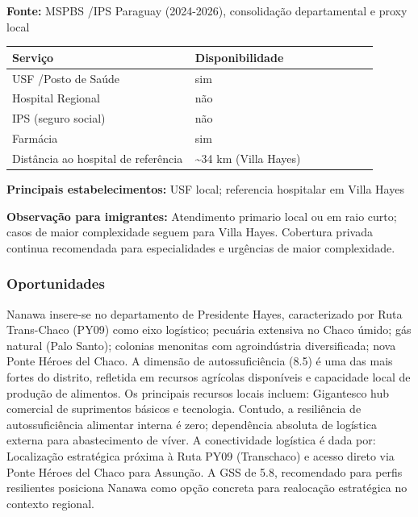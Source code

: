 \textbf{Fonte:} MSPBS /\allowbreak  IPS Paraguay (2024-2026), consolidação
departamental e proxy local

{\def\LTcaptype{none} %
\begin{longtable}{@{}>{\raggedright\arraybackslash}p{0.45\linewidth} >{\raggedright\arraybackslash}p{0.45\linewidth}@{}}
\toprule\noalign{}
Serviço & Disponibilidade \\
\midrule\noalign{}
\endhead
\bottomrule\noalign{}
\endlastfoot
USF /\allowbreak  Posto de Saúde & sim \\
Hospital Regional & não \\
IPS (seguro social) & não \\
Farmácia & sim \\
Distância ao hospital de referência & \textasciitilde34 km (Villa
Hayes) \\
\end{longtable}
}

\textbf{Principais estabelecimentos:} USF local; referencia hospitalar
em Villa Hayes

\textbf{Observação para imigrantes:} Atendimento primario local ou em
raio curto; casos de maior complexidade seguem para Villa Hayes.
Cobertura privada continua recomendada para especialidades e urgências
de maior complexidade.
\newpage

\subsubsection*{Oportunidades}\label{oport-nanawa-1505}
Nanawa insere-se no departamento de Presidente Hayes, caracterizado por Ruta Trans-Chaco (PY09) como eixo logístico; pecuária extensiva no Chaco úmido; gás natural (Palo Santo); colonias menonitas com agroindústria diversificada; nova Ponte Héroes del Chaco. A dimensão de autossuficiência (8.5) é uma das mais fortes do distrito, refletida em recursos agrícolas disponíveis e capacidade local de produção de alimentos. Os principais recursos locais incluem: Gigantesco hub comercial de suprimentos básicos e tecnologia. Contudo, a resiliência de autossuficiência alimentar interna é zero; dependência absoluta de logística externa para abastecimento de víver. A conectividade logística é dada por: Localização estratégica próxima à Ruta PY09 (Transchaco) e acesso direto via Ponte Héroes del Chaco para Assunção. A GSS de 5.8, recomendado para perfis resilientes posiciona Nanawa como opção concreta para realocação estratégica no contexto regional.

